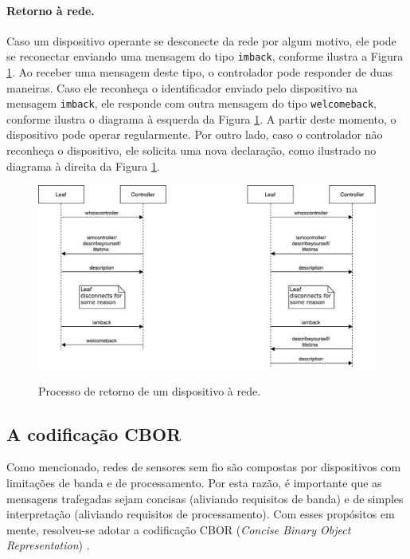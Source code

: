 \paragraph*{Retorno à rede.} Caso um dispositivo operante se desconecte da rede por algum motivo, ele pode se reconectar enviando uma mensagem do tipo \texttt{imback}, conforme ilustra a Figura \ref{fig:uml_reconnect}. Ao receber uma mensagem deste tipo, o controlador pode responder de duas maneiras. Caso ele reconheça o identificador enviado pelo dispositivo na mensagem \texttt{imback}, ele responde com outra mensagem do tipo \texttt{welcomeback}, conforme ilustra o diagrama à esquerda da Figura \ref{fig:uml_reconnect}. A partir deste momento, o dispositivo pode operar regularmente. Por outro lado, caso o controlador não reconheça o dispositivo, ele solicita uma nova declaração, como ilustrado no diagrama à direita da Figura \ref{fig:uml_reconnect}.

\begin{figure}[h]
	\centering
	\caption{Processo de retorno de um dispositivo à rede.}
	\medskip
  \includegraphics[width=\textwidth]{imagens/uml_reconnect.pdf}
  \label{fig:uml_reconnect}
\end{figure}

\subsection{A codificação CBOR}
Como mencionado, redes de sensores sem fio são compostas por dispositivos com limitações de banda e de processamento. Por esta razão, é importante que as mensagens trafegadas sejam concisas (aliviando requisitos de banda) e de simples interpretação (aliviando requisitos de processamento). Com esses propósitos em mente, resolveu-se adotar a codificação CBOR (\textit{Concise Binary Object Representation}) \cite{rfc7049}.


